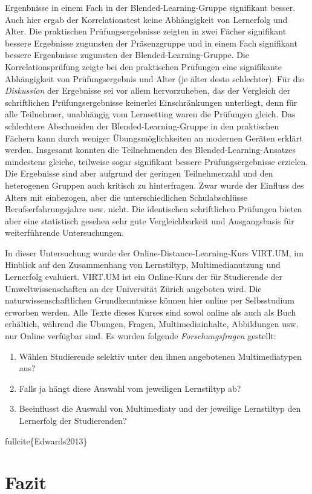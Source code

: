 \documentclass[12pt, bibliography=totoc]{scrartcl}
\begin{document}
Ergenbnisse in einem Fach in der Blended-Learning-Gruppe signifikant
besser. Auch hier ergab der Korrelationstest keine Abhängigkeit von
Lernerfolg und Alter. Die praktischen Prüfungsergebnisse zeigten in zwei
Fächer signifikant bessere Ergebnisse zugunsten der Präsenzgruppe und in
einem Fach signifikant bessere Ergenbnisse zugunsten der
Blended-Learning-Gruppe. Die Korrelationsprüfung zeigte bei den
praktischen Prüfungen eine signifikante Abhängigkeit von
Prüfungsergebnis und Alter (je älter desto schlechter). Für die
\emph{Diskussion} der Ergebnisse sei vor allem hervorzuheben, das der
Vergleich der schriftlichen Prüfungsergebnisse keinerlei Einschränkungen
unterliegt, denn für alle Teilnehmer, unabhängig vom Lernsetting waren
die Prüfungen gleich. Das schlechtere Abschneiden der
Blended-Learning-Gruppe in den praktischen Fächern kann durch weniger
Übungsmöglichkeiten an modernen Geräten erklärt werden. Insgesamt
konnten die Teilnehmenden des Blended-Learning-Ansatzes mindestens
gleiche, teilweise sogar signifikant bessere Prüfungsergebnisse
erzielen. Die Ergebnisse sind aber aufgrund der geringen Teilnehmerzahl
und den heterogenen Gruppen auch kritisch zu hinterfragen. Zwar wurde
der Einfluss des Alters mit einbezogen, aber die unterschiedlichen
Schulabschlüsse Berufserfahrungsjahre usw. nicht. Die identischen
schriftlichen Prüfungen bieten aber eine statistisch gesehen sehr gute
Vergleichbarkeit und Ausgangsbasis für weiterführende Untersuchungen.

\textbf{}

In dieser Untersuchung wurde der Online-Distance-Learning-Kurs VIRT.UM,
im Hinblick auf den Zusammenhang von Lernstiltyp, Multimedianutzung und
Lernerfolg evaluiert. VIRT.UM ist ein Online-Kurs der für Studierende
der Umweltwissenschaften an der Universität Zürich angeboten wird. Die
naturwissenschaftlichen Grundkenntnisse können hier online per
Selbsstudium erworben werden. Alle Texte dieses Kurses sind sowol online
als auch als Buch erhältich, während die Übungen, Fragen,
Multimediainhalte, Abbildungen usw. nur Online verfügbar sind. Es wurden
folgende \emph{Forschungsfragen} gestellt:

\begin{enumerate}
\def\labelenumi{\arabic{enumi}.}
\itemsep1pt\parskip0pt
\item
  Wählen Studierende selektiv unter den ihnen angebotenen
  Multimediatypen aus?
\item
  Falls ja hängt diese Auswahl vom jeweiligen Lernstiltyp ab?
\item
  Beeinflusst die Auswahl von Multimediaty und der jeweilige Lernstiltyp
  den Lernerfolg der Studierenden?
\end{enumerate}



fullcite\{Edwards2013\}

\section{Fazit}\label{fazit}
\pagebreak
\printbibliography
\pagebreak
%
%
\end{document}
